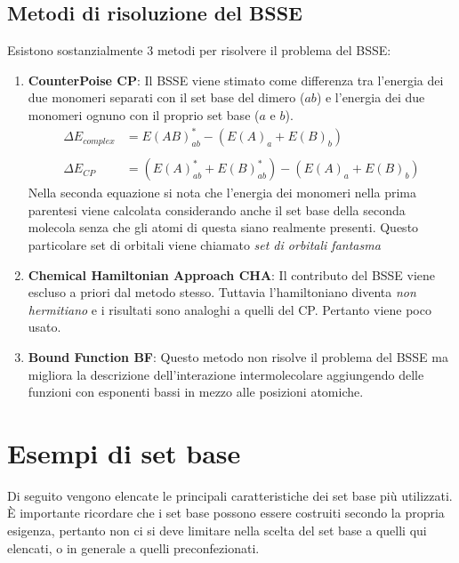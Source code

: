 \documentclass[oneside]{amsbook}
\numberwithin{section}{chapter}
\numberwithin{equation}{section}
\numberwithin{figure}{section}
\begin{document}
\subsection{Metodi di risoluzione del BSSE}
Esistono sostanzialmente $3$ metodi per risolvere il problema del BSSE:
\begin{enumerate}
\item \textbf{CounterPoise CP}: Il BSSE viene stimato come differenza tra l'energia dei due monomeri separati con il set base del dimero ($ab$) e l'energia dei due monomeri ognuno con il proprio set base ($a$ e $b$).
\begin{equation}
\begin{aligned}
\Delta E_{complex} &= E(AB)_{ab}^* - (E(A)_a+E(B)_b) \\ \\
\Delta E_{CP} &= (E(A)^*_{ab}+E(B)_{ab}^*) - (E(A)_a+E(B)_b)
\end{aligned}
\end{equation}
Nella seconda equazione si nota che l'energia dei monomeri nella prima parentesi viene calcolata considerando anche il set base della seconda molecola senza che gli atomi di questa siano realmente presenti. Questo particolare set di orbitali viene chiamato \emph{set di orbitali fantasma}
\item \textbf{Chemical Hamiltonian Approach CHA}:  Il contributo del BSSE viene escluso a priori dal metodo stesso. Tuttavia l'hamiltoniano diventa \emph{non hermitiano} e i risultati sono analoghi a quelli del CP. Pertanto viene poco usato.
\item \textbf{Bound Function BF}: Questo metodo non risolve il problema del BSSE ma migliora la descrizione dell'interazione intermolecolare aggiungendo delle funzioni con esponenti bassi in mezzo alle posizioni atomiche.
\end{enumerate}
\section{Esempi di set base}
Di seguito vengono elencate le principali caratteristiche dei set base più utilizzati. \`E importante ricordare che i set base possono essere costruiti secondo la propria esigenza, pertanto non ci si deve limitare nella scelta del set base a quelli qui elencati, o in generale a quelli preconfezionati.
\end{document}

